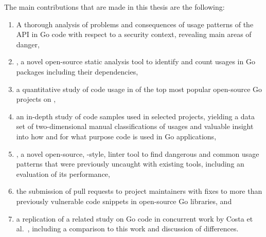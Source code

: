 The main contributions that are made in this thesis are the following:

\begin{enumerate}
    \item A thorough analysis of problems and consequences of usage patterns of the \unsafe{} \acrshort{API} in Go code
    with respect to a security context, revealing  main areas of danger,

    \item \toolGeiger, a novel open-source static analysis tool to identify and count \unsafe{} usages in Go packages
    including their dependencies,

    \item a quantitative study of \unsafe{} code usage in \projsAnalyzed{} of the top \projsTotal{} most popular
    open-source Go projects on \github{},

    \item an in-depth study of \numberLabeledCodeSnippets{} code samples used in \projsForLabeledCodeSnippets{} selected
    projects, yielding a data set of two-dimensional manual classifications of usages and valuable insight into how and
    for what purpose \unsafe{} code is used in Go applications,

    \item \toolSafer{}, a novel open-source, \toolVet{}-style, linter tool to find  dangerous and common
    \unsafe{} usage patterns that were previously uncaught with existing tools, including an evaluation of its
    performance,

    \item the submission of \numberPRs{} pull requests to project maintainers with fixes to more than
    \numberBugsFixedRounded{} previously vulnerable code snippets in open-source Go libraries, and

    \item a replication of a related study on \unsafe{} Go code in concurrent work by Costa et al.~\cite{costa2020},
    including a comparison to this work and discussion of differences.
\end{enumerate}

